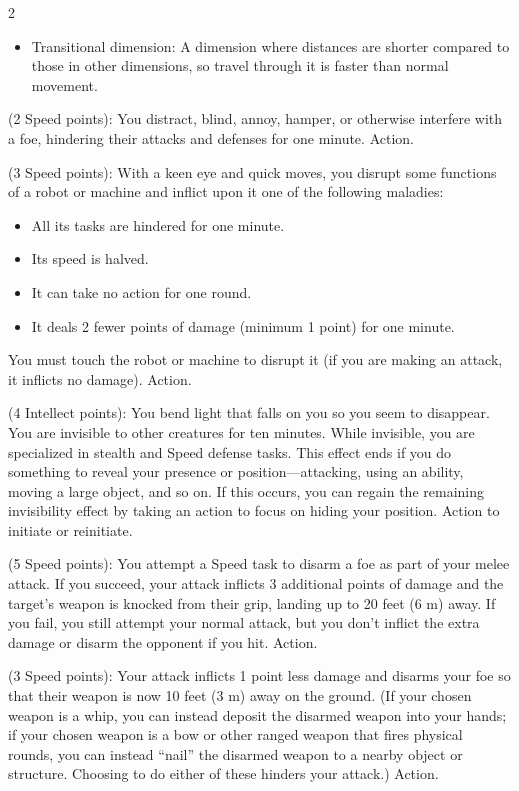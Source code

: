 \begin{multicols}{2}
\begin{itemize} 
\item Transitional dimension: A dimension where distances are shorter compared to those in other dimensions, so travel through it is faster than normal movement.
\end{itemize}

 (2 Speed points): You distract, blind, annoy, hamper, or otherwise interfere with a foe, hindering their attacks and defenses for one minute. Action. 

 (3 Speed points): With a keen eye and quick moves, you disrupt some functions of a robot or machine and inflict upon it one of the following maladies: 
\begin{itemize} 
\item All its tasks are hindered for one minute. 
\item Its speed is halved. 
\item It can take no action for one round. 
\item It deals 2 fewer points of damage (minimum 1 point) for one minute. 
\end{itemize}

You must touch the robot or machine to disrupt it (if you are making an attack, it inflicts no damage). Action. 

 (4 Intellect points): You bend light that falls on you so you seem to disappear. You are invisible to other creatures for ten minutes. While invisible, you are specialized in stealth and Speed defense tasks. This effect ends if you do something to reveal your presence or position—attacking, using an ability, moving a large object, and so on. If this occurs, you can regain the remaining invisibility effect by taking an action to focus on hiding your position. Action to initiate or reinitiate. 

 (5 Speed points): You attempt a Speed task to disarm a foe as part of your melee attack. If you succeed, your attack inflicts 3 additional points of damage and the target’s weapon is knocked from their grip, landing up to 20 feet (6 m) away. If you fail, you still attempt your normal attack, but you don’t inflict the extra damage or disarm the opponent if you hit. Action. 

 (3 Speed points): Your attack inflicts 1 point less damage and disarms your foe so that their weapon is now 10 feet (3 m) away on the ground. (If your chosen weapon is a whip, you can instead deposit the disarmed weapon into your hands; if your chosen weapon is a bow or other ranged weapon that fires physical rounds, you can instead “nail” the disarmed weapon to a nearby object or structure. Choosing to do either of these hinders your attack.) Action. 


\end{multicols}

